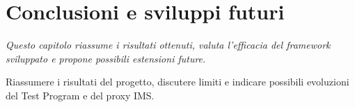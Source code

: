 \chapter{Conclusioni e sviluppi futuri}
\begin{minipage}{12cm}\textit{Questo capitolo riassume i risultati ottenuti, valuta l'efficacia del framework sviluppato e propone possibili estensioni future.}
\end{minipage}
\vspace*{1cm}

Riassumere i risultati del progetto, discutere limiti e indicare possibili evoluzioni del Test Program e del proxy IMS.
 
